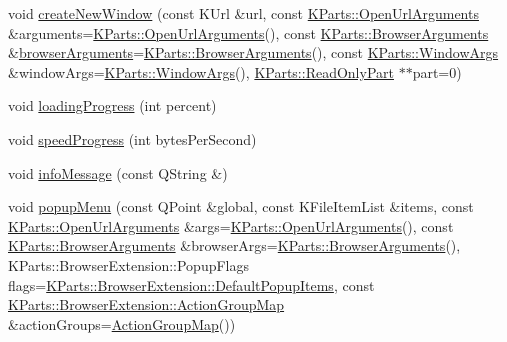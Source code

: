 \begin{DoxyCompactItemize}
void \hyperlink{classKParts_1_1BrowserExtension_a99ae7fd5726079c473de103bf3e33833}{create\-New\-Window} (const \-K\-Url \&url, const \hyperlink{classKParts_1_1OpenUrlArguments}{\-K\-Parts\-::\-Open\-Url\-Arguments} \&arguments=\hyperlink{classKParts_1_1OpenUrlArguments}{\-K\-Parts\-::\-Open\-Url\-Arguments}(), const \hyperlink{structKParts_1_1BrowserArguments}{\-K\-Parts\-::\-Browser\-Arguments} \&\hyperlink{classKParts_1_1BrowserExtension_a8bd50c2c5bd6b43d15c4af157977cc42}{browser\-Arguments}=\hyperlink{structKParts_1_1BrowserArguments}{\-K\-Parts\-::\-Browser\-Arguments}(), const \hyperlink{classKParts_1_1WindowArgs}{\-K\-Parts\-::\-Window\-Args} \&window\-Args=\hyperlink{classKParts_1_1WindowArgs}{\-K\-Parts\-::\-Window\-Args}(), \hyperlink{classKParts_1_1ReadOnlyPart}{\-K\-Parts\-::\-Read\-Only\-Part} $\ast$$\ast$part=0)
\item 
void \hyperlink{classKParts_1_1BrowserExtension_a347035c05f6d6064f18ee656d61faed7}{loading\-Progress} (int percent)
\item 
void \hyperlink{classKParts_1_1BrowserExtension_a51c00341228e2280d548e960b3d1fbe6}{speed\-Progress} (int bytes\-Per\-Second)
\item 
void \hyperlink{classKParts_1_1BrowserExtension_af07247232a4925903ed26ec9f9433aa4}{info\-Message} (const \-Q\-String \&)
\item 
void \hyperlink{classKParts_1_1BrowserExtension_a97f2ed6d4318555095512275f6988484}{popup\-Menu} (const \-Q\-Point \&global, const \-K\-File\-Item\-List \&items, const \hyperlink{classKParts_1_1OpenUrlArguments}{\-K\-Parts\-::\-Open\-Url\-Arguments} \&args=\hyperlink{classKParts_1_1OpenUrlArguments}{\-K\-Parts\-::\-Open\-Url\-Arguments}(), const \hyperlink{structKParts_1_1BrowserArguments}{\-K\-Parts\-::\-Browser\-Arguments} \&browser\-Args=\hyperlink{structKParts_1_1BrowserArguments}{\-K\-Parts\-::\-Browser\-Arguments}(), \-K\-Parts\-::\-Browser\-Extension\-::\-Popup\-Flags flags=\hyperlink{classKParts_1_1BrowserExtension_ae5b9acf92e7d83faf5142597371ef1e3a59ee58fca9e8b900d617c4f232b497f7}{\-K\-Parts\-::\-Browser\-Extension\-::\-Default\-Popup\-Items}, const \hyperlink{classKParts_1_1BrowserExtension_a73ab162c395443c0227946524a8ee04c}{\-K\-Parts\-::\-Browser\-Extension\-::\-Action\-Group\-Map} \&action\-Groups=\hyperlink{classKParts_1_1BrowserExtension_a73ab162c395443c0227946524a8ee04c}{\-Action\-Group\-Map}())
\item 
$$
\end{DoxyCompactItemize}
